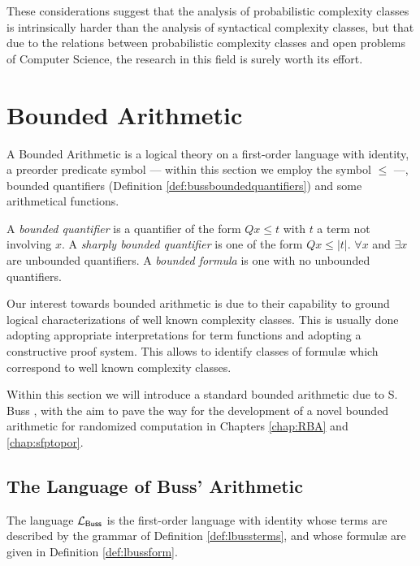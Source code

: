 These considerations suggest that the analysis of probabilistic complexity classes
is intrinsically harder than the analysis of syntactical complexity classes, but that
due to the relations between probabilistic complexity classes and open problems
of Computer Science, the research in this field is surely worth its effort.


\section{Bounded Arithmetic}

A Bounded Arithmetic is a logical theory on a first-order language with identity, a preorder predicate symbol --- within this section we employ the symbol $\le$ ---, bounded quantifiers (Definition \ref{def:bussboundedquantifiers}) and some arithmetical functions.

\begin{defn}
  \label{def:bussboundedquantifiers}
  A \emph{bounded quantifier} is a quantifier of the form $Qx \le t$ with
  $t$ a term not involving $x$. A \emph{sharply bounded quantifier} is one of the form $Qx \le |t|$. $\forall x$ and $\exists x$ are unbounded quantifiers. A \emph{bounded formula} is
  one with no unbounded quantifiers.
\end{defn}

Our interest towards bounded arithmetic is due to
their capability to ground logical characterizations of well known complexity classes. This is usually done adopting appropriate interpretations
for term functions and adopting a constructive proof system.
%
This allows to identify classes of formul\ae{} which correspond to
well known complexity classes.

Within this section we will introduce a standard bounded arithmetic due to S.
Buss \cite{Buss86}, with the aim to pave the way for the development of a
novel bounded arithmetic for randomized computation in Chapters \ref{chap:RBA} and
\ref{chap:sfptopor}.

\subsection{The Language of Buss' Arithmetic}

The language $\mathcal{L}_{\mathsf{Buss}}$ is the first-order language with identity whose terms are
described by the grammar of Definition \ref{def:lbussterms}, and whose formul\ae{}
are given in Definition \ref{def:lbussform}.

